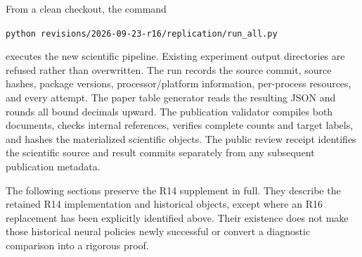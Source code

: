 From a clean checkout, the command
\begin{center}\small\texttt{python revisions/2026-09-23-r16/replication/run\_all.py}\end{center}
executes the new scientific pipeline. Existing experiment output directories are refused rather than overwritten. The run records the source commit, source hashes, package versions, processor/platform information, per-process resources, and every attempt. The paper table generator reads the resulting JSON and rounds all bound decimals upward. The publication validator compiles both documents, checks internal references, verifies complete counts and target labels, and hashes the materialized scientific objects. The public review receipt identifies the scientific source and result commits separately from any subsequent publication metadata.

The following sections preserve the R14 supplement in full. They describe the retained R14 implementation and historical objects, except where an R16 replacement has been explicitly identified above. Their existence does not make those historical neural policies newly successful or convert a diagnostic comparison into a rigorous proof.
